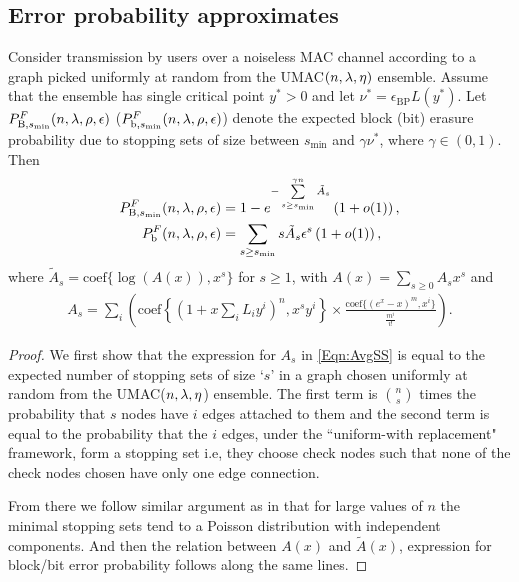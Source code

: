 \subsection{Error probability approximates}
\label{sec:UMACapproximate}
\begin{theorem}
Consider transmission by users over a noiseless MAC channel according to a graph picked uniformly at random from the UMAC$(n,\lambda,\eta)$ ensemble. Assume that the ensemble has single critical point $y^*>0$ and let $\nu^*=\epsilon_{\text{BP}}L(y^*)$. Let $P_{\text{B},s_{\min}}^{F}(n,\lambda,\rho,\epsilon)$ ($P_{\text{b},s_{\min}}^{F}(n,\lambda,\rho,\epsilon)$) denote the expected block (bit) erasure probability due to stopping sets of size between $s_{\min}$ and  $\gamma \nu^*$, where $\gamma\in (0,1)$. Then
\begin{align}
P_{\text{B},s_{\min}}^{F}(n,\lambda,\rho,\epsilon)&=1-e^{-\sum\limits_{s\geq s_{\text{min}}}^{\gamma n}\tilde{A}_{s}}\left(1+o(1)\right),\label{Eqn:PBAnalytic}\\
P_{\text{b}}^{F}(n,\lambda,\rho,\epsilon)&=\sum_{s\geq s_{\min}}s\tilde{A}_{s}\epsilon^s\left(1+o(1)\right),\label{Eqn:PbAnalytic}
\end{align}
where $\tilde{A}_{s}=\text{coef}\{\log(A(x)),x^s\}$ for $s\geq 1$, with $A(x)=\sum_{s\geq 0} A_{s}x^s$ and
\begin{align}
A_{s}=\sum_{i}\left(\text{coef}\left\lbrace (1+x\sum_{i}L_{i}y^{i})^{n}, x^{s}y^{i} \right\rbrace \times \frac{\text{coef}\lbrace (e^x -x)^{m},x^{i}\rbrace }{\frac{m^i}{i!}}\right).\label{Eqn:AvgSS}
\end{align}
\label{Thm:UMACFloor}
\end{theorem}

\begin{proof}
We first show that the expression for $A_{s}$ in \eqref{Eqn:AvgSS} is equal to the expected number of stopping sets of size `$s$' in a graph chosen uniformly at random from the UMAC($n,\lambda,\eta$) ensemble. The first term is $\binom{n}{s}$ times the probability that $s$ nodes have $i$ edges attached to them and the second term is equal to the probability that the $i$ edges, under the ``uniform-with replacement" framework, form a stopping set i.e, they choose check nodes such that none of the check nodes chosen have only one edge connection.

From there we follow similar argument as in \cite{richardson2008modern} that for large values of $n$ the minimal stopping sets tend to a Poisson distribution with independent components. And then the relation between $A(x)$ and $\tilde{A}(x)$, expression for block/bit error probability follows along the same lines.
\end{proof}

